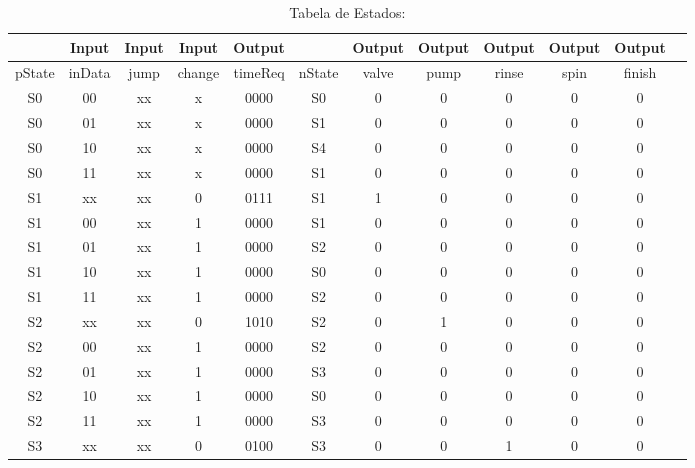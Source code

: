 \begin{table}[H]
	\footnotesize
	\centering
	\caption{Tabela de Estados:}
	\begin{tabular}{|c|c|c|c|c|c|c|c|c|c|c|c|}\hline
	
				& Input	 & Input  & Input  & Output	 & 		   & Output		 & Output 	  & Output & Output & Output \\
        \hline		
		pState 	& inData & jump   & change & timeReq & nState  & valve & pump & rinse & spin & finish 	\\ 
        \hline
        S0 		& 00 	 & xx 	  & x		& 0000	 & S0      & 0     	     & 0 	      & 0	  & 0    & 0 	 	\\
		S0 		& 01 	 & xx 	  & x		& 0000	 & S1 	   & 0 	   	     & 0 	      & 0 	  & 0    & 0	 	\\
        S0 		& 10 	 & xx 	  & x		& 0000	 & S4      & 0     	     & 0 	      & 0	  & 0    & 0 	 	\\
        S0 		& 11 	 & xx 	  & x		& 0000	 & S1      & 0     	     & 0 	      & 0	  & 0    & 0 	 	\\
		\hline		
		S1 		& xx 	 & xx 	  & 0		& 0111	 & S1      & 1     	     & 0 	      & 0	  & 0    & 0 	 	\\
		S1 		& 00 	 & xx 	  & 1		& 0000	 & S1      & 0     	     & 0 	      & 0	  & 0    & 0 	 	\\
		S1 		& 01 	 & xx 	  & 1		& 0000	 & S2      & 0     	     & 0 	      & 0	  & 0    & 0 	 	\\
		S1 		& 10 	 & xx 	  & 1		& 0000	 & S0      & 0     	     & 0 	      & 0	  & 0    & 0 	 	\\
		S1 		& 11 	 & xx 	  & 1		& 0000	 & S2      & 0     	     & 0 	      & 0	  & 0    & 0 	 	\\
		\hline		
		S2 		& xx 	 & xx 	  & 0		& 1010	 & S2      & 0     	     & 1 	      & 0	  & 0    & 0 	 	\\
		S2 		& 00 	 & xx 	  & 1		& 0000	 & S2      & 0     	     & 0 	      & 0	  & 0    & 0 	 	\\
		S2 		& 01 	 & xx 	  & 1		& 0000	 & S3      & 0     	     & 0 	      & 0	  & 0    & 0 	 	\\
		S2 		& 10 	 & xx 	  & 1		& 0000	 & S0      & 0     	     & 0 	      & 0	  & 0    & 0 	 	\\
		S2 		& 11 	 & xx 	  & 1		& 0000	 & S3      & 0     	     & 0 	      & 0	  & 0    & 0 	 	\\
		\hline
		S3 		& xx 	 & xx 	  & 0		& 0100	 & S3      & 0     	     & 0 	      & 1	  & 0    & 0 	 	\\

\end{tabular}
\end{table}
